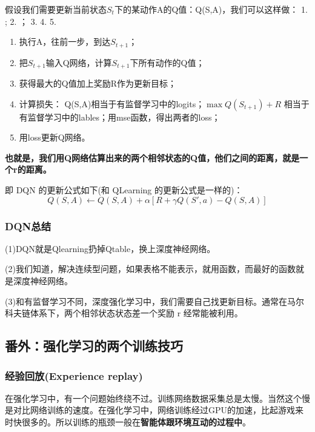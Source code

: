 \documentclass[12pt]{article}
\begin{document}
假设我们需要更新当前状态$S_t$下的某动作A的Q值：Q(S,A)，我们可以这样做： 1. ; 2. ； 3.  4. 5. 

\begin{enumerate}
\setlength{\itemsep}{0pt}
\setlength{\parsep}{0pt}
\setlength{\parskip}{0pt}
    \item 执行A，往前一步，到达$S_{t+1}$；
    \item 把$S_{t+1}$输入Q网络，计算$S_{t+1}$下所有动作的Q值；
    \item 获得最大的Q值加上奖励R作为更新目标；
    \item 计算损失： Q(S,A)相当于有监督学习中的logits；$\max Q(S_{t+1}) + R$ 相当于有监督学习中的lables；用mse函数，得出两者的loss；
    \item 用loss更新Q网络。
\end{enumerate}

\textbf{也就是，我们用Q网络估算出来的两个相邻状态的Q值，他们之间的距离，就是一个r的距离。}

即 DQN 的更新公式如下(和 QLearning 的更新公式是一样的)：
$$
Q(S,A) \leftarrow Q(S,A) + \alpha[R + \gamma Q(S', a) - Q(S,A)]
$$

\subsubsection{DQN总结}
(1)DQN就是Qlearning扔掉Qtable，换上深度神经网络。

(2)我们知道，解决连续型问题，如果表格不能表示，就用函数，而最好的函数就是深度神经网络。

(3)和有监督学习不同，深度强化学习中，我们需要自己找更新目标。通常在马尔科夫链体系下，两个相邻状态状态差一个奖励 r 经常能被利用。

\subsection{番外：强化学习的两个训练技巧}
\subsubsection{经验回放(Experience replay)}
在强化学习中，有一个问题始终绕不过。训练网络数据采集总是太慢。当然这个慢是对比网络训练的速度。在强化学习中，网络训练经过GPU的加速，比起游戏来时快很多的。所以训练的瓶颈一般在\textbf{智能体跟环境互动的过程中}。
\end{document}
